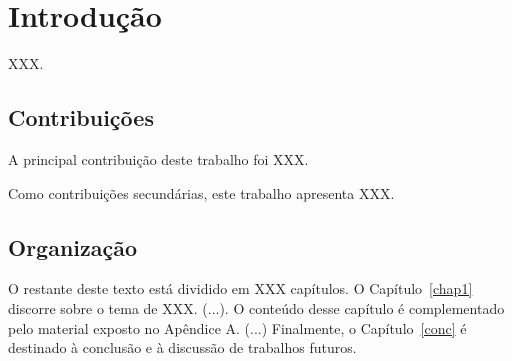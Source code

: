 \chapter{Introdução}
\label{intro}
\thispagestyle{plain}

XXX.

\section{Contribuições}
A principal contribuição deste trabalho foi XXX.

Como contribuições secundárias, este trabalho apresenta XXX.

\section{Organização}

O restante deste texto está dividido em XXX capítulos. O Capítulo~\ref{chap1} discorre sobre o tema de XXX. (...). O conteúdo desse capítulo é complementado pelo material exposto no Apêndice A. (...) Finalmente, o Capítulo~\ref{conc} é destinado à conclusão e à discussão de trabalhos futuros.
